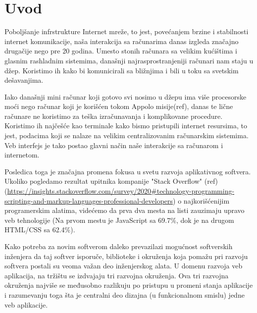 \documentclass[12pt,oneside]{memoir}
\begin{document}
\frontmatter
\naslovna
\komisija
\apstrakt
\tableofcontents*

\mainmatter

\chapter{Uvod}
Poboljšanje infrstrukture Internet mreže, to jest, povećanjem brzine i stabilnosti internet komunikacije,
naša interakcija sa računarima danas izgleda značajno drugačije nego pre 20 godina. Umesto stonih računara sa velikim kućištima i glasnim rashladnim sistemima,
današnji najrasprostranjeniji računari nam staju u džep. Koristimo ih kako bi komunicirali sa bližnjima i bili u toku sa svetskim dešavanjima.

Iako današnji mini računar koji gotovo svi nosimo u džepu ima više procesorske moći nego računar koji je korišćen tokom Appolo misije(ref), 
danas te lične računare ne koristimo za teška izračunavanja i komplikovane procedure. Koristimo ih najčešće kao terminale kako bismo pristupili internet resursima,
to jest, podacima koji se nalaze na velikim centralizovanim računarskim sistemima. Veb interfejs je tako postao glavni način naše interakcije sa računarom i internetom.

Posledica toga je značajna promena fokusa u svetu razvoja aplikativnog softvera. Ukoliko pogledamo rezultat upitnika kompanije "Stack Overflow" (ref)({\url{https://insights.stackoverflow.com/survey/2020#technology-programming-scripting-and-markup-languages-professional-developers}}) o najkorišćenijim programerskim alatima, videćemo da prva dva mesta na listi
zauzimaju upravo veb tehnologije (Na prvom mestu je JavaScript sa 69.7\%, dok je na drugom HTML/CSS sa 62.4\%).

Kako potreba za novim softverom daleko prevazilazi mogućnost softverskih inženjera da taj softver isporuče, biblioteke i okruženja koja pomažu pri razvoju softvera postali su veoma važan deo inženjerskog alata.
U domenu razvoja veb aplikacija, na tržištu se izdvajaju tri razvojna okruženja. Ova tri razvojna okruženja najviše se međusobno razlikuju po pristupu u promeni stanja aplikacije i razumevanju
toga šta je centralni deo dizajna (u funkcionalnom smislu) jedne veb aplikacije.
\end{document}
